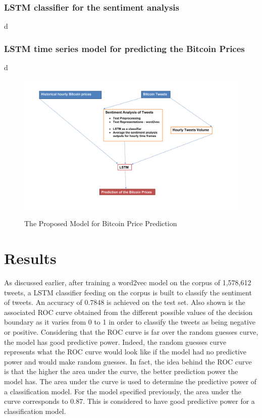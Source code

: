 \documentclass[conference]{IEEEtran}
\begin{document}
\subsubsection{LSTM classifier for the sentiment analysis}
d
\subsubsection{LSTM time series model for predicting the Bitcoin Prices}
d
\begin{minipage}{\linewidth}
\begin{figure}[H]
\centering
\caption{The Proposed Model for Bitcoin Price Prediction} 
\includegraphics[scale=0.28]{Graphs/PlanProject.pdf}
\label{Project Plan} 
\end{figure}
\end{minipage}

\section{Results}
\par As discussed earlier, after training a word2vec model on the corpus of 1,578,612 tweets, a LSTM classifier feeding on the corpus is built to classify the sentiment of tweets. An accuracy of 0.7848 is achieved on the test set. Also shown is the associated ROC curve obtained from the different possible values of the decision boundary as it varies from 0 to 1 in order to classify the tweets as being negative or positive. Considering that the ROC curve is far over the random guesses curve, the model has good predictive power. Indeed, the random guesses curve represents what the ROC curve would look like if the model had no predictive power and would make random guesses. In fact, the idea behind the ROC curve is that the higher the area under the curve, the better prediction power the model has. The area under the curve is used to determine the predictive power of a classification model. For the model specified previously, the area under the curve corresponds to 0.87. This is considered to have good predictive power for a classification model.
\end{document}
